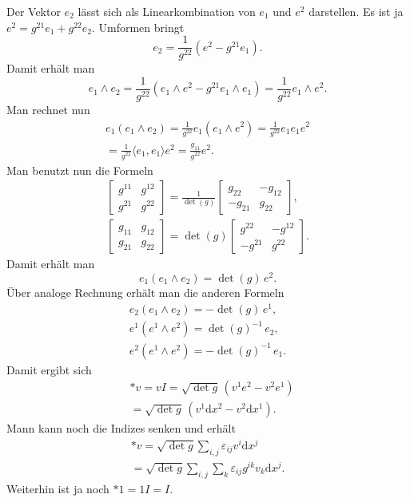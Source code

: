 \documentclass[a4paper,11pt,fleqn,twocolumn,twoside]{scrartcl}
\numberwithin{equation}{section}
\begin{document}
Der Vektor $e_2$ lässt sich als Linearkombination von $e_1$
und $e^2$ darstellen. Es ist ja $e^2=g^{21}e_1+g^{22}e_2$.
Umformen bringt
\begin{equation}
e_2 = \frac{1}{g^{22}}(e^2-g^{21}e_1).
\end{equation}
Damit erhält man
\[e_1\wedge e_2
= \frac{1}{g^{22}}(e_1\wedge e^2-g^{21}e_1\wedge e_1)
= \frac{1}{g^{22}}e_1\wedge e^2.\]
Man rechnet nun
\begin{gather*}
e_1(e_1\wedge e_2) = \frac{1}{g^{22}}e_1(e_1\wedge e^2)
= \frac{1}{g^{22}}e_1e_1e^2\\
= \frac{1}{g^{22}}\langle e_1,e_1\rangle e^2
= \frac{g_{11}}{g^{22}}e^2.
\end{gather*}
Man benutzt nun die Formeln
\begin{gather}
\begin{bmatrix}
g^{11} & g^{12}\\
g^{21} & g^{22}
\end{bmatrix}
= \frac{1}{\det(g)}
\begin{bmatrix}
g_{22} & -g_{12}\\
-g_{21} & g_{22}
\end{bmatrix},\\
\begin{bmatrix}
g_{11} & g_{12}\\
g_{21} & g_{22}
\end{bmatrix}
= \det(g)
\begin{bmatrix}
g^{22} & -g^{12}\\
-g^{21} & g^{22}
\end{bmatrix}.
\end{gather}
Damit erhält man
\begin{equation}
e_1(e_1\wedge e_2) = \det(g)\,e^2.
\end{equation}
Über analoge Rechnung erhält man die anderen Formeln
\begin{gather}
e_2(e_1\wedge e_2) = -\det(g)\,e^1,\\
e^1(e^1\wedge e^2) = \det(g)^{-1}\,e_2,\\
e^2(e^1\wedge e^2) = -\det(g)^{-1}\,e_1.
\end{gather}
Damit ergibt sich
\begin{equation}
\begin{split}
& *v = vI = \sqrt{\det g}\,(v^1 e^2 - v^2 e^1)\\
&= \sqrt{\det g}\,(v^1 \mathrm dx^2 - v^2 \mathrm dx^1).
\end{split}
\end{equation}
Mann kann noch die Indizes senken und erhält
\begin{equation}
\begin{split}
*v = \sqrt{\det g}\sum_{i,j}\varepsilon_{ij}v^i \mathrm dx^j\\
= \sqrt{\det g}\sum_{i,j}
\sum_{k}\varepsilon_{ij}g^{ik}v_k \mathrm dx^j.
\end{split}
\end{equation}
Weiterhin ist ja noch $*1 = 1I=I$.
\end{document}

